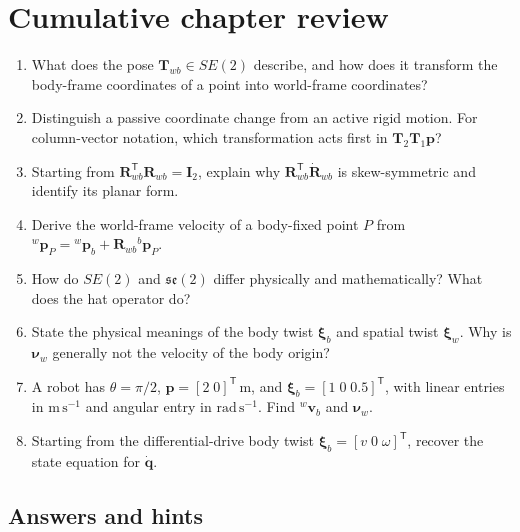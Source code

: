 \documentclass[
  australian,
  12pt,
  letterpaper,
  DIV=11,
  numbers=noendperiod,
  twoside]{scrreprt}
\providecommand{\tightlist}{%
  \setlength{\itemsep}{0pt}\setlength{\parskip}{0pt}}
\begin{document}
\section*{Cumulative chapter review}\label{cumulative-chapter-review}


\begin{enumerate}
\def\labelenumi{\arabic{enumi}.}
\tightlist
\item
  What does the pose \(\mathbf T_{wb}\in SE(2)\) describe, and how does
  it transform the body-frame coordinates of a point into world-frame
  coordinates?
\item
  Distinguish a passive coordinate change from an active rigid motion.
  For column-vector notation, which transformation acts first in
  \(\mathbf T_2\mathbf T_1\mathbf p\)?
\item
  Starting from \(\mathbf R_{wb}^\mathsf T\mathbf R_{wb}=\mathbf I_2\),
  explain why \(\mathbf R_{wb}^\mathsf T\dot{\mathbf R}_{wb}\) is
  skew-symmetric and identify its planar form.
\item
  Derive the world-frame velocity of a body-fixed point \(P\) from
  \({}^w\mathbf p_P={}^w\mathbf p_b+\mathbf R_{wb}{}^b\mathbf p_P\).
\item
  How do \(SE(2)\) and \(\mathfrak{se}(2)\) differ physically and
  mathematically? What does the hat operator do?
\item
  State the physical meanings of the body twist \(\boldsymbol\xi_b\) and
  spatial twist \(\boldsymbol\xi_w\). Why is \(\boldsymbol\nu_w\)
  generally not the velocity of the body origin?
\item
  A robot has \(\theta=\pi/2\),
  \(\mathbf p=[2\;0]^\mathsf T\,\mathrm m\), and
  \(\boldsymbol\xi_b=[1\;0\;0.5]^\mathsf T\), with linear entries in
  \(\mathrm{m\,s^{-1}}\) and angular entry in \(\mathrm{rad\,s^{-1}}\).
  Find \({}^w\mathbf v_b\) and \(\boldsymbol\nu_w\).
\item
  Starting from the differential-drive body twist
  \(\boldsymbol\xi_b=[v\;0\;\omega]^\mathsf T\), recover the state
  equation for \(\dot{\mathbf q}\).
\end{enumerate}

\subsection*{Answers and hints}\label{answers-and-hints-14}
\end{document}
